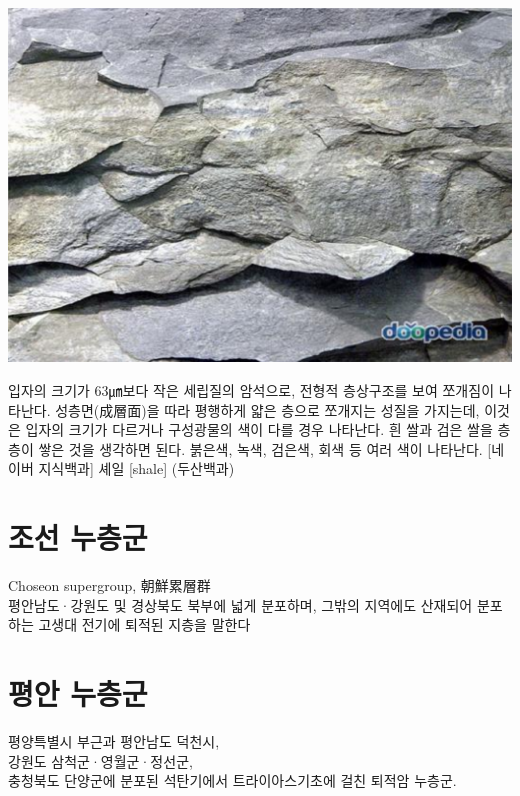 \documentclass[12pt,a4paper]{book}
\newcommand{\SectionMargin}			{\newpage  \null \vskip 0cm}
\begin{document}
		\includegraphics[scale=0.9,  width=1.0\textwidth]{./fig/fig__101.pdf}


		입자의 크기가 63㎛보다 작은 세립질의 암석으로, 전형적 층상구조를 보여 쪼개짐이 나타난다. 
		성층면(成層面)을 따라 평행하게 얇은 층으로 쪼개지는 성질을 가지는데, 
		이것은 입자의 크기가 다르거나 구성광물의 색이 다를 경우 나타난다. 
		흰 쌀과 검은 쌀을 층층이 쌓은 것을 생각하면 된다. 붉은색, 녹색, 검은색, 회색 등 여러 색이 나타난다.
		[네이버 지식백과] 셰일 [shale] (두산백과)


	\SectionMargin
	\section{조선 누층군}
	\null

		Choseon supergroup, 朝鮮累層群\\

		평안남도·강원도 및 경상북도 북부에 넓게 분포하며, 
		그밖의 지역에도 산재되어 분포하는 고생대 전기에 퇴적된 지층을 말한다





	\SectionMargin
	\section{평안 누층군}
	\null

		\setlength{\fboxsep}{12pt}
		\begin{boxedminipage}[c]{1.0\linewidth}
			평양특별시 부근과 평안남도 덕천시,\\
			강원도 삼척군·영월군·정선군, \\
			충청북도 단양군에 분포된 석탄기에서 트라이아스기초에 걸친 퇴적암 누층군.
		\end{boxedminipage} \null
\end{document}
